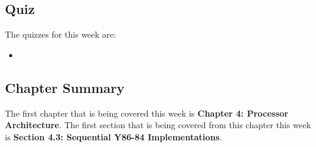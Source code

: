 \subsection{Quiz}

The quizzes for this week are:

\begin{itemize}
    \item {}
\end{itemize}

\subsection{Chapter Summary}

The first chapter that is being covered this week is \textbf{Chapter 4: Processor Architecture}. The first section that is being covered from this chapter this week is \textbf{Section 4.3: Sequential Y86-84 Implementations}.

